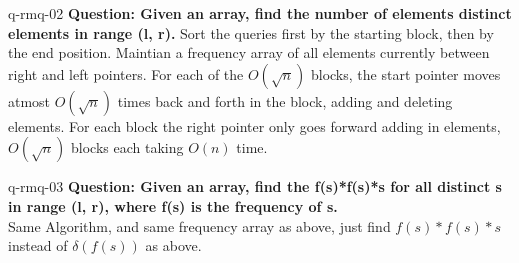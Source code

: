 \begin{example}{q-rmq-02}
    \textbf{Question: Given an array, find the number of elements distinct elements in range (l, r).}
    Sort the queries first by the starting block, then by the end position. Maintian a frequency array of all elements currently between right and left pointers. For each of the $O(\sqrt{n})$ blocks, the start pointer moves atmost $O(\sqrt{n})$ times back and forth in the block, adding and deleting elements. For each block the right pointer only goes forward adding in elements, $O(\sqrt{n})$ blocks each taking $O(n)$ time.
\end{example}

\begin{example}{q-rmq-03}
    \textbf{Question: Given an array, find the f(s)*f(s)*s for all distinct s in range (l, r), where f(s) is the frequency of s.} \\
    Same Algorithm, and same frequency array as above, just find $f(s)*f(s)*s$ instead of $\delta(f(s))$ as above.
\end{example}
